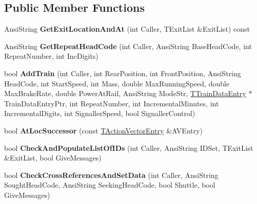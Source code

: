 \subsection*{Public Member Functions}
\begin{DoxyCompactItemize}
\item 
\mbox{\label{class_t_train_controller_ae6c904f201d8bb23b3c0714226244890}} 
Ansi\+String {\bfseries Get\+Exit\+Location\+And\+At} (int Caller, T\+Exit\+List \&Exit\+List) const
\item 
\mbox{\label{class_t_train_controller_afb0e8fd36435809350cb323ab9fe2213}} 
Ansi\+String {\bfseries Get\+Repeat\+Head\+Code} (int Caller, Ansi\+String Base\+Head\+Code, int Repeat\+Number, int Inc\+Digits)
\item 
\mbox{\label{class_t_train_controller_ae9b32534ac7db1c3b0965fc375834132}} 
bool {\bfseries Add\+Train} (int Caller, int Rear\+Position, int Front\+Position, Ansi\+String Head\+Code, int Start\+Speed, int Mass, double Max\+Running\+Speed, double Max\+Brake\+Rate, double Power\+At\+Rail, Ansi\+String Mode\+Str, \mbox{\hyperlink{class_t_train_data_entry}{T\+Train\+Data\+Entry}} $\ast$Train\+Data\+Entry\+Ptr, int Repeat\+Number, int Incremental\+Minutes, int Incremental\+Digits, int Signaller\+Speed, bool Signaller\+Control)
\item 
\mbox{\label{class_t_train_controller_a7fbe0dc297130da79bcfa3503c6c51c1}} 
bool {\bfseries At\+Loc\+Successor} (const \mbox{\hyperlink{class_t_action_vector_entry}{T\+Action\+Vector\+Entry}} \&A\+V\+Entry)
\item 
\mbox{\label{class_t_train_controller_ae91c1a77699c9daf327938081eab2241}} 
bool {\bfseries Check\+And\+Populate\+List\+Of\+I\+Ds} (int Caller, Ansi\+String I\+D\+Set, T\+Exit\+List \&Exit\+List, bool Give\+Messages)
\item 
\mbox{\label{class_t_train_controller_a72662be9ecd0e95131779bd10b6fe14f}} 
bool {\bfseries Check\+Cross\+References\+And\+Set\+Data} (int Caller, Ansi\+String Sought\+Head\+Code, Ansi\+String Seeking\+Head\+Code, bool Shuttle, bool Give\+Messages)
\item 

\end{DoxyCompactItemize}
